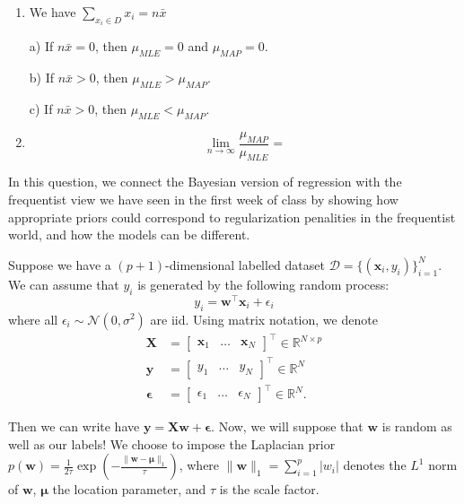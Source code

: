 \documentclass[submit]{harvardml}
\begin{document}
\begin{enumerate}
\item

We have $\sum_{x_i\in D} x_i = n\bar{x}$

a) If $n\bar{x} = 0$, then $\mu_{MLE} = 0$ and $\mu_{MAP} = 0$.

b) If $n\bar{x} > 0$, then $\mu_{MLE} > \mu_{MAP}$.

c) If $n\bar{x} > 0$, then $\mu_{MLE} < \mu_{MAP}$.

\item

$$\lim_{n \rightarrow \infty} \frac{\mu_{MAP}}{\mu_{MLE}} = $$


\end{enumerate}


\newpage

\begin{problem}
    In this question, we connect the Bayesian version of regression with the frequentist view we have seen in the first week of class by showing how appropriate priors could correspond to regularization penalities in the frequentist world, and how the models can be different.
    
    Suppose we have a $(p+1)$-dimensional labelled dataset $\mathcal{D} = \{(\mathbf{x}_i, y_i)\}_{i=1}^N$. We can assume that $y_i$ is generated by the following random process: $$y_i = \mathbf{w}^\top\mathbf{x}_i + \epsilon_i$$ where all $\epsilon_i \sim \mathcal{N}(0,\sigma^2)$ are iid. Using matrix notation, we denote
    \begin{align*}
      \mathbf{X} &= \begin{bmatrix}\mathbf{x}_1 & \ldots & \mathbf{x}_N\end{bmatrix}^\top \in \mathbb{R}^{N \times p} \\
      \mathbf{y} &= \begin{bmatrix} y_1 & \dots & y_N \end{bmatrix}^\top  \in \mathbb{R}^N \\
      \mathbf{\epsilon} &= \begin{bmatrix} \epsilon_1 & \dots & \epsilon_N \end{bmatrix}^\top \in \mathbb{R}^N.
    \end{align*}
    
    Then we can write have $\mathbf{y} = \mathbf{X}\mathbf{w} + \mathbf{\epsilon}$. Now, we will suppose that $\mathbf{w}$ is random as well as our labels! We choose to impose the Laplacian prior $p(\mathbf{w})=\frac{1}{2\tau}\exp\left(-\frac{\|\mathbf{w}-\mathbf{\mu}\|_1}{\tau}\right)$, where $\|\mathbf{w}\|_1=\sum_{i=1}^p |w_i|$ denotes the $L^1$ norm of $\mathbf{w}$, $\mathbf{\mu}$ the location parameter, and $\tau$ is the scale factor.
    

\end{problem}
\end{document}
